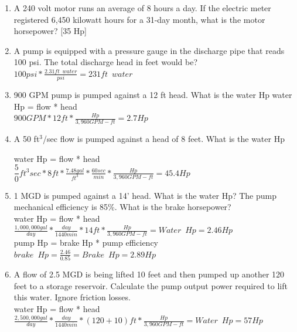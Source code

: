\documentclass{article}
\begin{document}
\begin{enumerate}
  
\item A 240 volt motor runs an average of 8 hours a day.  If the electric meter registered 6,450 kilowatt hours for a 31-day month, what is the motor horsepower? [35 Hp]




\item A pump is equipped with a pressure gauge in the discharge pipe that reads 100 psi. The total discharge head in feet would be?\\
\vspace{0.4cm}
$100psi*\frac{2.31ft \enspace water}{psi}=\boxed{231ft \enspace water}$
\vspace{0.4cm}

\vspace{0.4cm}
\item 900 GPM pump is pumped against a 12 ft head.  What is the water Hp
\vspace{0.4cm}
water Hp = flow * head\\
$900GPM*12ft*\frac{Hp}{3,960 GPM-ft}=\boxed{2.7Hp}$

\item A 50 ft$^3$/sec flow is pumped against a head of 8 feet.  What is the water Hp

\vspace{0.4cm}
water Hp = flow * head\\
$\dfrac50{ft^3}{sec}*8ft*\frac{7.48 gal}{ft^3}*\frac{60sec}{min}*\frac{Hp}{3,960 GPM-ft}=\boxed{45.4Hp}$

\item 1 MGD is pumped against a 14’ head.  What is the water Hp?  The pump mechanical efficiency is 85\%.  What is the brake horsepower?\\
\vspace{0.4cm}
water Hp = flow * head\\
$\frac{1,000,000gal}{day}*\frac{day}{1440min}*14ft*\frac{Hp}{3,960 GPM-ft}=\boxed{Water \enspace Hp = 2.46Hp}$\\
\vspace{0.4cm}
pump Hp = brake Hp * pump efficiency\\
$brake \enspace Hp = \frac{2.46}{0.85}=\boxed{Brake \enspace Hp=2.89Hp}$


\item A flow of 2.5 MGD is being lifted 10 feet and then pumped up another 120 feet to a storage reservoir. Calculate the pump output power required to lift this water. Ignore friction losses.\\
\vspace{0.4cm}
water Hp = flow * head\\
$\frac{2,500,000gal}{day}*\frac{day}{1440min}*(120+10)ft*\frac{Hp}{3,960 GPM-ft}=\boxed{Water \enspace Hp = 57Hp}$\\
\pagebreak



\end{enumerate}
\end{document}
